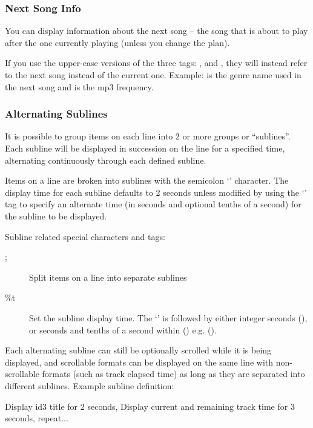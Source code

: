 \subsubsection{Next Song Info}
You can display information about the next song -- the song that is
about to play after the one currently playing (unless you change the
plan).

If you use the upper-case versions of the
three tags: ,  and , they will instead refer to
the next song instead of the current one. Example:  is the genre
name used in the next song and  is the mp3 frequency.\\


\subsubsection{\label{ref:AlternatingSublines}Alternating Sublines}

It is possible to group items on each line into 2 or more groups or
``sublines''. Each subline will be displayed in succession on the line for a
specified time, alternating continuously through each defined subline.

Items on a line are broken into sublines with the semicolon
`\config{;}' character. The display time for
each subline defaults to 2 seconds unless modified by using the
`' tag to specify an alternate
time (in seconds and optional tenths of a second) for the subline to be
displayed.

Subline related special characters and tags:
\begin{description}
\item[;] Split items on a line into separate sublines
\item[\%t] Set the subline display time. The
`' is followed by either integer seconds (), or seconds
and tenths of a second within () e.g. ().
\end{description}

Each alternating subline can still be optionally scrolled while it is
being displayed, and scrollable formats can be displayed on the same
line with non{}-scrollable formats (such as track elapsed time) as long
as they are separated into different sublines.
Example subline definition:
\begin{example}
                                 Display id3 title for 2 seconds,
                                 Display current and remaining track time
                                 for 3 seconds,
                                 repeat...
\end{example}

